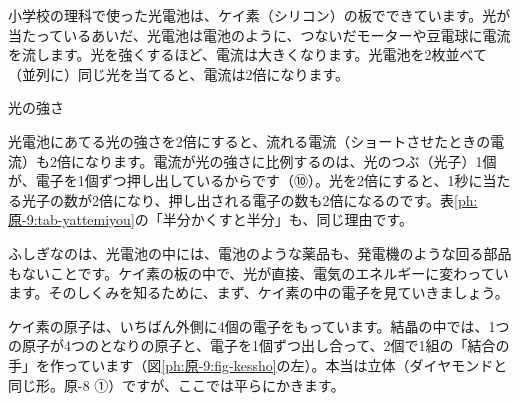 \label{ph:原-9:sec1}
小学校の理科で使った光電池は、ケイ素（シリコン）の板でできています。光が当たっているあいだ、光電池は電池のように、つないだモーターや豆電球に電流を流します。光を強くするほど、電流は大きくなります。光電池を2枚並べて（並列に）同じ光を当てると、電流は2倍になります。
\begin{phbaisuru}{光の強さ}
\noindent\begin{minipage}[c]{0.48\linewidth}\raggedright
光電池にあてる光の強さを2倍にすると、流れる電流（ショートさせたときの電流）も2倍になります。電流が光の強さに比例するのは、光のつぶ（光子）1個が、電子を1個ずつ押し出しているからです（⑩）。光を2倍にすると、1秒に当たる光子の数が2倍になり、押し出される電子の数も2倍になるのです。表\ref{ph:原-9:tab-yattemiyou}の「半分かくすと半分」も、同じ理由です。
\end{minipage}\hfill
\begin{minipage}[c]{0.48\linewidth}\centering
{}
\end{minipage}
\end{phbaisuru}
ふしぎなのは、光電池の中には、電池のような薬品も、発電機のような回る部品もないことです。ケイ素の板の中で、光が直接、電気のエネルギーに変わっています。そのしくみを知るために、まず、ケイ素の中の電子を見ていきましょう。

\label{ph:原-9:sec2}
ケイ素の原子は、いちばん外側に4個の電子をもっています。結晶の中では、1つの原子が4つのとなりの原子と、電子を1個ずつ出し合って、2個で1組の「結合の手」を作っています（図\ref{ph:原-9:fig-kessho}の左）。本当は立体（ダイヤモンドと同じ形。原-8 ①）ですが、ここでは平らにかきます。

